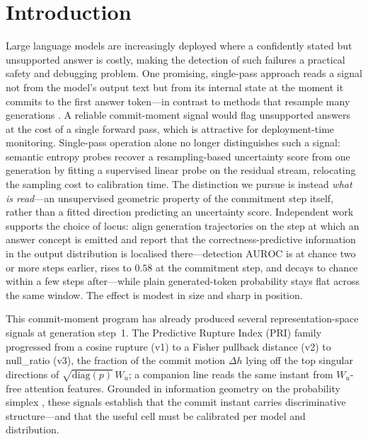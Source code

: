 \documentclass[10pt, letterpaper]{article}
\newcommand{\auroc}{\text{AUROC}}
\newcommand{\Wu}{W_{u}}
\newcommand{\nullr}{\textsf{null\_ratio}}
\begin{document}
\section{Introduction}

Large language models are increasingly deployed where a confidently
stated but unsupported answer is costly, making the detection of such
failures a practical safety and debugging problem. One promising,
single-pass approach reads a signal not from the model's output text
but from its internal state at the moment it commits to the first
answer token---in contrast to methods that resample many generations
\citep{farquhar2024semantic}. A reliable
commit-moment signal would flag unsupported answers at the cost of a
single forward pass, which is attractive for deployment-time
monitoring. Single-pass operation alone no longer distinguishes such a
signal: semantic entropy probes \citep{kossen2024sep} recover a
resampling-based uncertainty score from one generation by fitting a
supervised linear probe on the residual stream, relocating the
sampling cost to calibration time. The distinction we pursue is
instead \emph{what is read}---an unsupervised geometric property of
the commitment step itself, rather than a fitted direction predicting
an uncertainty score. Independent work supports the choice of locus:
\citet{yeom2026commitment} align generation trajectories on the step at
which an answer concept is emitted and report that the correctness-predictive
information in the output distribution is localised there---detection
$\auroc$ is at chance two or more steps earlier, rises to $0.58$ at the
commitment step, and decays to chance within a few steps after---while
plain generated-token probability stays flat across the same window. The
effect is modest in size and sharp in position.

This commit-moment program has already produced several
representation-space signals at generation step~1. The Predictive
Rupture Index (PRI) family progressed from a cosine rupture (v1) to a
Fisher pullback distance (v2) to \nullr{} (v3), the fraction of the
commit motion $\Delta h$ lying off the top singular directions of
$\sqrt{\mathrm{diag}(p)}\,\Wu$; a companion line reads the same instant
from $\Wu$-free attention features. Grounded in information geometry on the probability
simplex \citep{amari2016information}, these signals establish that the
commit instant carries discriminative structure---and that the useful
cell must be calibrated per model and distribution.
\end{document}
